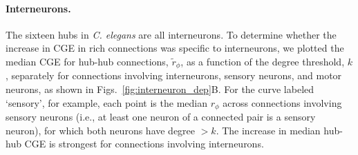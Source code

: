 \documentclass[10pt,letterpaper]{article}
\begin{document}
\paragraph{Interneurons.}
The sixteen hubs in \textit{C. elegans} are all interneurons.
To determine whether the increase in CGE in rich connections was specific to interneurons, we plotted the median CGE for hub-hub connections, $\tilde{r}_\phi$, as a function of the degree threshold, $k$, separately for connections involving interneurons, sensory neurons, and motor neurons, as shown in Figs.~\ref{fig:interneuron_dep}B.
For the curve labeled `sensory', for example, each point is the median $r_\phi$ across connections involving sensory neurons (i.e., at least one neuron of a connected pair is a sensory neuron), for which both neurons have degree $>k$.
The increase in median hub-hub CGE is strongest for connections involving interneurons.
\end{document}
